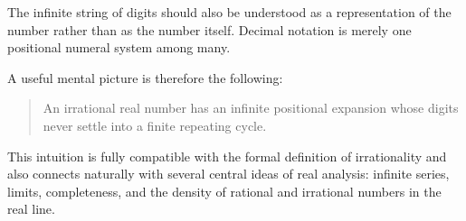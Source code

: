 \documentclass{essay}
\begin{document}
The infinite string of digits should also be understood as a representation of the number rather than as the number itself. Decimal notation is merely one positional numeral system among many.

A useful mental picture is therefore the following:

\begin{quote}
  An irrational real number has an infinite positional expansion whose digits never settle into a finite repeating cycle.
\end{quote}

This intuition is fully compatible with the formal definition of irrationality and also connects naturally with several central ideas of real analysis: infinite series, limits, completeness, and the density of rational and irrational numbers in the real line.
\end{document}
